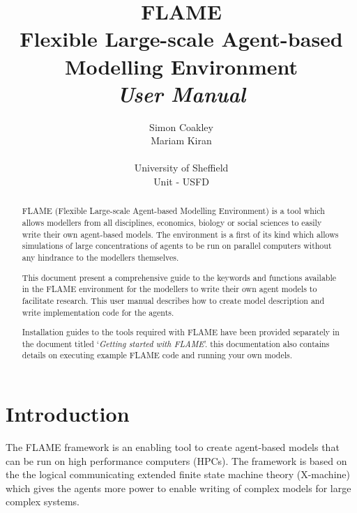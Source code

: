 \documentclass[12pt,a4paper]{article}
\begin{document}
\title{\textbf{FLAME}
\\Flexible Large-scale Agent-based Modelling Environment\\
 \emph{User Manual}}
\author{Simon Coakley\\Mariam Kiran
\\
\\ University of Sheffield
\\ Unit - USFD}

\maketitle

\pagebreak

\begin{abstract}

FLAME (Flexible Large-scale Agent-based Modelling Environment) is a
tool which allows modellers from all disciplines, economics, biology
or social sciences to easily write their own agent-based models. The
environment is a first of its kind which allows simulations of large
concentrations of agents to be run on parallel computers without any
hindrance to the modellers themselves.

This document present a comprehensive guide to the keywords and
functions available in the FLAME environment for the modellers to
write their own agent models to facilitate research. This user
manual describes how to create model description and write
implementation code for the agents.

Installation guides to the tools required with FLAME have been
provided separately in the document titled `\emph{Getting started
with FLAME}'. this documentation also contains details on executing
example FLAME code and running your own models.

\end{abstract}

\pagebreak
\tableofcontents
\pagebreak

\section{Introduction}

The FLAME framework is an enabling tool to create agent-based models
that can be run on high performance computers (HPCs). The framework
is based on the the logical communicating extended finite state
machine theory (X-machine) which gives the agents more power to
enable writing of complex models for large complex systems.
\end{document}
